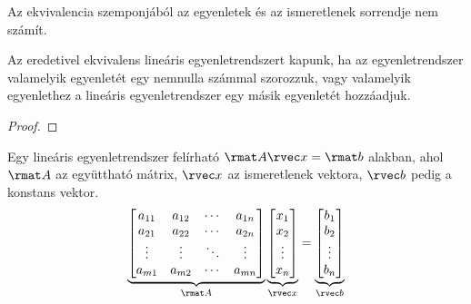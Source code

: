 \begin{note}
  Az ekvivalencia szemponjából az egyenletek és az ismeretlenek sorrendje nem
  számít.
\end{note}

\begin{statement}
  Az eredetivel ekvivalens lineáris egyenletrendszert kapunk, ha az
  egyenletrendszer valamelyik egyenletét egy nemnulla számmal szorozzuk, vagy
  valamelyik egyenlethez a lineáris egyenletrendszer egy másik egyenletét
  hozzáadjuk.

  \begin{proof}
    \vspace{10em}
  \end{proof}
\end{statement}

\clearpage
\begin{blueBox}

  Egy lineáris egyenletrendszer felírható $\rmat A \rvec x = \rmat b$
  alakban, ahol $\rmat A$ az együttható mátrix, $\rvec x$ az ismeretlenek
  vektora, $\rvec b$ pedig a konstans vektor.
  $$
    \underbrace{\begin{bmatrix}
        a_{11} & a_{12} & \cdots & a_{1n} \\
        a_{21} & a_{22} & \cdots & a_{2n} \\
        \vdots & \vdots & \ddots & \vdots \\
        a_{m1} & a_{m2} & \cdots & a_{mn}
      \end{bmatrix}}_{\rmat A} \underbrace{\begin{bmatrix}
        x_{1} \\ x_{2} \\ \vdots \\ x_{n}
      \end{bmatrix}}_{\rvec x} = \underbrace{\begin{bmatrix}
        b_{1} \\ b_{2} \\ \vdots \\ b_{n}
      \end{bmatrix}}_{\rvec b}
  $$
\end{blueBox}

